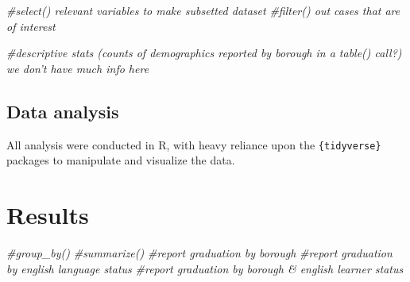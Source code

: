 \documentclass[
  english,
  man, fleqn, noextraspace]{apa6}
\newenvironment{Shaded}{\begin{snugshade}}{\end{snugshade}}
\newcommand{\CommentTok}[1]{\textcolor[rgb]{0.56,0.35,0.01}{\textit{#1}}}
\begin{document}
\begin{Shaded}
\begin{Highlighting}[]
\CommentTok{#select() relevant variables to make subsetted dataset}
\CommentTok{#filter() out cases that are of interest }
\end{Highlighting}
\end{Shaded}

\begin{Shaded}
\begin{Highlighting}[]
\CommentTok{#descriptive stats (counts of demographics reported by borough in a table() call?) we don't have much info here}
\end{Highlighting}
\end{Shaded}

\hypertarget{data-analysis}{%
\subsection{Data analysis}\label{data-analysis}}

All analysis were conducted in R, with heavy reliance upon the \texttt{\{tidyverse\}} packages to manipulate and visualize the data.

\hypertarget{results}{%
\section{Results}\label{results}}

\begin{Shaded}
\begin{Highlighting}[]
\CommentTok{#group_by() }
\CommentTok{#summarize() }
\CommentTok{#report graduation by borough}
\CommentTok{#report graduation by english language status}
\CommentTok{#report graduation by borough & english learner status}
\end{Highlighting}
\end{Shaded}
\end{document}
